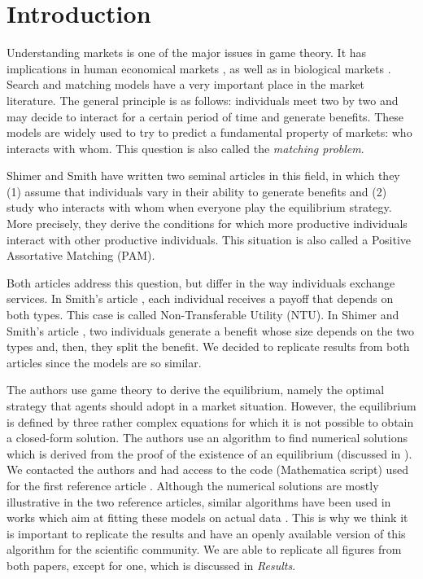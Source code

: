 \section*{Introduction}

Understanding markets is one of the major issues in game theory. It has implications in human economical markets \citep{osborne_bargaining_1990,chade_sorting_2017}, as well as in biological markets \citep{noe_biological_1995,hammerstein_biological_2016,fruteau_supply_2009,baumard_mutualistic_2013}. Search and matching models have a very important place in the market literature. The general principle is as follows: individuals meet two by two and may decide to interact for a certain period of time and generate benefits. These models are widely used to try to predict a fundamental property of markets: who interacts with whom. This question is also called the \textit{matching problem}.

Shimer and Smith have written two seminal articles \citep{shimer_assortative_2000,smith_marriage_2006} in this field, in which they (1) assume that individuals vary in their ability to generate benefits and (2) study who interacts with whom when everyone play the equilibrium strategy. More precisely, they derive the conditions for which more productive individuals interact with other productive individuals. This situation is also called a Positive Assortative Matching (PAM).

Both articles address this question, but differ in the way individuals exchange services. In Smith's article \citep{smith_marriage_2006}, each individual receives a payoff that depends on both types. This case is called Non-Transferable Utility (NTU). In Shimer and Smith's article \citep{shimer_assortative_2000}, two individuals generate a benefit whose size depends on the two types and, then, they split the benefit. We decided to replicate results from both articles since the models are so similar.

The authors use game theory to derive the equilibrium, namely the optimal strategy that agents should adopt in a market situation. However, the equilibrium is defined by three rather complex equations for which it is not possible to obtain a closed-form solution. The authors use an algorithm to find numerical solutions which is derived from the proof of the existence of an equilibrium (discussed in \citep{smith_frictional_2011}). We contacted the authors and had access to the code (Mathematica script) used for the first reference article \citep{shimer_assortative_2000}. Although the numerical solutions are mostly illustrative in the two reference articles, similar algorithms have been used in works which aim at fitting these models on actual data \citep{hagedorn_identifying_2017,lise_matching_2016}. This is why we think it is important to replicate the results and have an openly available version of this algorithm for the scientific community. We are able to replicate all figures from both papers, except for one, which is discussed in \textit{Results}.




